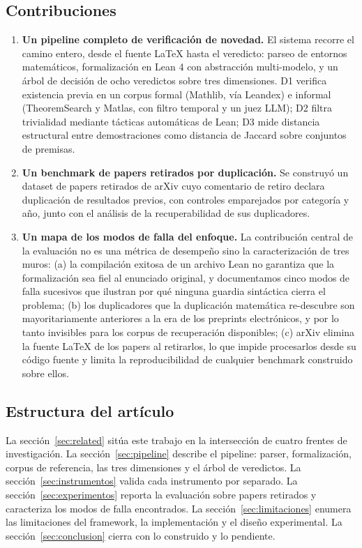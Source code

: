 \documentclass[12pt,a4paper]{article}
\theoremstyle{remark}
\begin{document}
\subsection{Contribuciones}

\begin{enumerate}
\item \textbf{Un pipeline completo de verificación de novedad.} El sistema recorre el camino entero, desde el fuente LaTeX hasta el veredicto: parseo de entornos matemáticos, formalización en Lean 4 con abstracción multi-modelo, y un árbol de decisión de ocho veredictos sobre tres dimensiones. D1 verifica existencia previa en un corpus formal (Mathlib, vía Leandex) e informal (TheoremSearch y Matlas, con filtro temporal y un juez LLM); D2 filtra trivialidad mediante tácticas automáticas de Lean; D3 mide distancia estructural entre demostraciones como distancia de Jaccard sobre conjuntos de premisas.

\item \textbf{Un benchmark de papers retirados por duplicación.} Se construyó un dataset de papers retirados de arXiv cuyo comentario de retiro declara duplicación de resultados previos, con controles emparejados por categoría y año, junto con el análisis de la recuperabilidad de sus duplicadores.

\item \textbf{Un mapa de los modos de falla del enfoque.} La contribución central de la evaluación no es una métrica de desempeño sino la caracterización de tres muros: (a) la compilación exitosa de un archivo Lean no garantiza que la formalización sea fiel al enunciado original, y documentamos cinco modos de falla sucesivos que ilustran por qué ninguna guardia sintáctica cierra el problema; (b) los duplicadores que la duplicación matemática re-descubre son mayoritariamente anteriores a la era de los preprints electrónicos, y por lo tanto invisibles para los corpus de recuperación disponibles; (c) arXiv elimina la fuente LaTeX de los papers al retirarlos, lo que impide procesarlos desde su código fuente y limita la reproducibilidad de cualquier benchmark construido sobre ellos.
\end{enumerate}

\subsection{Estructura del artículo}

La sección~\ref{sec:related} sitúa este trabajo en la intersección de cuatro frentes de investigación. La sección~\ref{sec:pipeline} describe el pipeline: parser, formalización, corpus de referencia, las tres dimensiones y el árbol de veredictos. La sección~\ref{sec:instrumentos} valida cada instrumento por separado. La sección~\ref{sec:experimentos} reporta la evaluación sobre papers retirados y caracteriza los modos de falla encontrados. La sección~\ref{sec:limitaciones} enumera las limitaciones del framework, la implementación y el diseño experimental. La sección~\ref{sec:conclusion} cierra con lo construido y lo pendiente.
\end{document}
